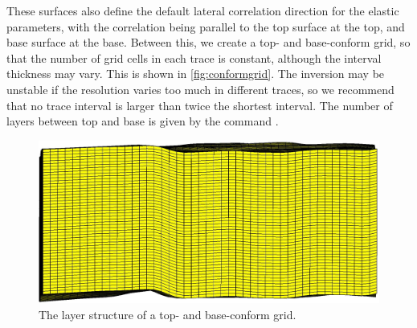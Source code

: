 These surfaces also define the default lateral correlation direction for the elastic parameters, with the correlation being parallel to the top surface at the top, and base surface at the base. Between this, we create a top- and base-conform grid, so that the number of grid cells in each trace is constant, although the interval thickness may vary. This is shown in \autoref{fig:conformgrid}. The inversion may be unstable if the resolution varies too much in different traces, so we recommend that no trace interval is larger than twice the shortest interval. The number of layers between top and base is given by the command .
\begin{figure}[H]
  \includegraphics[width=.99\linewidth]{images/conformgrid}
  \caption{The layer structure of a top- and base-conform grid.}
  \label{fig:conformgrid}
\end{figure}
